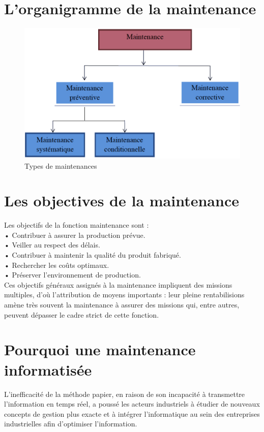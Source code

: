 \section{L'organigramme de la maintenance}
\begin{figure}[hp]
    \centering
    \includegraphics{images/mait_orga.png}
    \caption{Types de maintenances}
\end{figure}

\section{Les objectives de la maintenance}
Les objectifs de la fonction maintenance sont :\\
•	Contribuer à assurer la production prévue.\\
•	Veiller au respect des délais.\\
•	Contribuer à maintenir la qualité du produit fabriqué.\\
•	Rechercher les coûts optimaux.\\
•	Préserver l’environnement de production.\\

Ces objectifs généraux assignés à la maintenance impliquent des missions multiples, d’où l’attribution de moyens importants : leur pleine rentabilisions amène très souvent la maintenance à assurer des missions qui, entre autres, peuvent dépasser le cadre strict de cette fonction.

\section{Pourquoi une maintenance informatisée}
L’inefficacité de la méthode papier, en raison de son incapacité à transmettre l’information en temps réel, 
a poussé les acteurs industriels à étudier de nouveaux concepts de gestion plus exacte et à intégrer 
l’informatique au sein des entreprises industrielles afin d’optimiser l’information.

